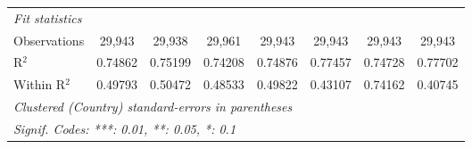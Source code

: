 \begin{tabular}{lccccccc}
   \midrule
   \emph{Fit statistics}\\
   Observations                  & 29,943          & 29,938          & 29,961         & 29,943         & 29,943        & 29,943          & 29,943\\  
   R$^2$                         & 0.74862         & 0.75199         & 0.74208        & 0.74876        & 0.77457       & 0.74728         & 0.77702\\  
   Within R$^2$                  & 0.49793         & 0.50472         & 0.48533        & 0.49822        & 0.43107       & 0.74162         & 0.40745\\  
   \midrule \midrule
   \multicolumn{8}{l}{\emph{Clustered (Country) standard-errors in parentheses}}\\
   \multicolumn{8}{l}{\emph{Signif. Codes: ***: 0.01, **: 0.05, *: 0.1}}\\
\end{tabular}
\par\endgroup


